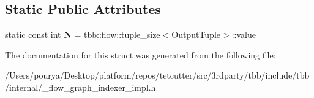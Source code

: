 \subsection*{Static Public Attributes}
\begin{DoxyCompactItemize}
\item 
\hypertarget{structinternal_1_1indexer__types_a25913edbb46c8f228aa679d6ec3defbe}{}static const int {\bfseries N} = tbb\+::flow\+::tuple\+\_\+size$<$Output\+Tuple$>$\+::value\label{structinternal_1_1indexer__types_a25913edbb46c8f228aa679d6ec3defbe}

\end{DoxyCompactItemize}


The documentation for this struct was generated from the following file\+:\begin{DoxyCompactItemize}
\item 
/\+Users/pourya/\+Desktop/platform/repos/tetcutter/src/3rdparty/tbb/include/tbb/internal/\+\_\+flow\+\_\+graph\+\_\+indexer\+\_\+impl.\+h\end{DoxyCompactItemize}
